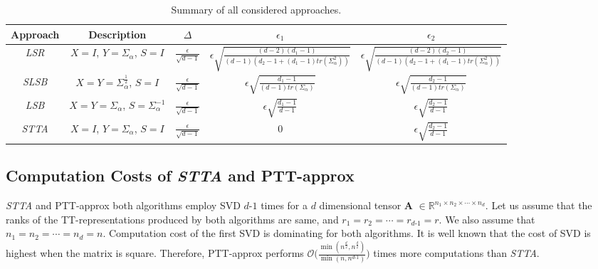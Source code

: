 \documentclass[sigconf]{acmart}
\makeatletter
\newcommand{\tensor}[1]{{\cal\textbf{#1}\xspace}}
\newcommand{\hfirst}{{\it LSR}\xspace}
\newcommand{\hsecond}{{\it SLSB}\xspace}
\newcommand{\hthird}{{\it LSB}\xspace}
\newcommand{\otta}{{\it STTA}\xspace}
\DeclareRobustCommand*\cal{\@fontswitch\relax\mathcal}
\makeatother
\begin{document}
\begin{table*}[htb]
	{\begin{tabular}{|c|c|c|c|c|}
			\hline
			Approach & Description & $\Delta$ & $\epsilon_1$ & $\epsilon_2$\\ \hline
			\hfirst & $X = I$, $Y = \Sigma_\alpha$, $S = I$ & $\frac{\epsilon}{\sqrt{d-1}}$ & $\epsilon \sqrt{\frac{(d-2)(d_1-1)}{(d-1) (d_2 -1 + (d_1-1) tr(\Sigma_\alpha^2))}}$ & $\epsilon \sqrt{\frac{(d-2)(d_2-1)}{(d-1) (d_2 -1 + (d_1-1) tr(\Sigma_\alpha^2))}}$\\ \hline
			\hsecond & $X=Y=\Sigma_\alpha^{\frac{1}{2}}$, $S=I$ & $\frac{\epsilon}{\sqrt{d-1}}$ &
			$\epsilon\sqrt{\frac{d_1-1}{(d-1)tr(\Sigma_\alpha)}}$ & $\epsilon\sqrt{\frac{d_2-1}{(d-1)tr(\Sigma_\alpha)}}$\\ \hline
			\hthird & $X=Y=\Sigma_\alpha$, $S=\Sigma_\alpha^{-1}$ & $\frac{\epsilon}{\sqrt{d-1}}$ &
			$\epsilon\sqrt{\frac{d_1-1}{d-1}}$ & $\epsilon\sqrt{\frac{d_2-1}{d-1}}$\\ \hline 
			\otta & $X=I$, $Y=\Sigma_\alpha$, $S=I$ & $\frac{\epsilon}{\sqrt{d-1}}$ &
			$0$ & $\epsilon\sqrt{\frac{d_2-1}{d-1}}$\\ \hline
	\end{tabular}}
	\caption{Summary of all considered approaches\label{tab:summary}.}
\end{table*}

\subsection{Computation Costs of \otta and PTT-approx}
\label{sec:exp:computationCost}
\otta and PTT-approx both algorithms employ SVD $d$-$1$ times for a $d$ dimensional tensor \tensor{A} $\in \mathbb{R}^{n_1 \times n_2 \times \cdots \times n_d}$. Let us assume that the ranks of the TT-representations produced by both algorithms are same, and $r_1=r_2=\cdots=r_{d\text{-}1}=r$. We also assume that $n_1=n_2=\cdots=n_d=n$. Computation cost of the first SVD is dominating for both algorithms. It is well known that the cost of SVD is highest when the matrix is square. Therefore, PTT-approx performs $\mathcal{O}\big(\frac{\min(n^{\frac{d}{2}}, n^{\frac{d}{2}}) }{\min(n,n^{d\text{-}1})} \big)$ times more computations than \otta.       
\end{document}
